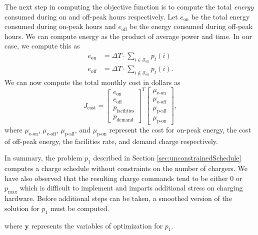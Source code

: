 The next step in computing the objective function is to compute the total {\it energy} consumed during on and off-peak hours respectively.  Let $e_{\text{on}}$ be the total energy consumed during on-peak hours and $e_{\text{off}}$ be the energy consumed during off-peak hours. We can compute energy as the product of average power and time.  In our case, we compute this as 
\begin{equation}\label{eqn:objective:energy}\begin{aligned}
	e_{\text{on}} &= \Delta T\cdot \sum_{i \in \mathcal{S}_{\text{on}}}p_t(i) \\ 
	e_{\text{off}} &= \Delta T\cdot \sum_{i \notin \mathcal{S}_{\text{on}}}p_t(i).  
\end{aligned}\end{equation}
We can now compute the total monthly cost in dollars as
\begin{equation}\label{sec:unconstrainedSchedule:objective}
J_{\text{cost}} = \begin{bmatrix}e_{\text{on}} \\ e_{\text{off}} \\ p_{\text{facilities}} \\ p_{\text{demand}} \end{bmatrix}^T \begin{bmatrix} \mu_{\text{e-on}} \\ \mu_{\text{e-off}} \\ \mu_{\text{p-all}} \\ \mu_{\text{p-on}} \end{bmatrix}, 
\end{equation}
where $\mu_{\text{e-on}}$, $\mu_{\text{e-off}}$, $\mu_{\text{p-all}}$, and $\mu_{\text{p-on}}$ represent the cost for on-peak energy, the cost of off-peak energy, the facilities rate, and demand charge respectively.
\par In summary, the problem $p_1$ described in Section \ref{sec:unconstrainedSchedule} computes a charge schedule without constraints on the number of chargers. We have also observed that the resulting charge commands tend to be either $0$ or $p_{\text{max}}$ which is difficult to implement and imparts additional stress on charging hardware. Before additional steps can be taken, a smoothed version of the solution for $p_1$ must be computed.
\\[0.1in]  
where $\mathbf{y}$ represents the variables of optimization for $p_1$.


